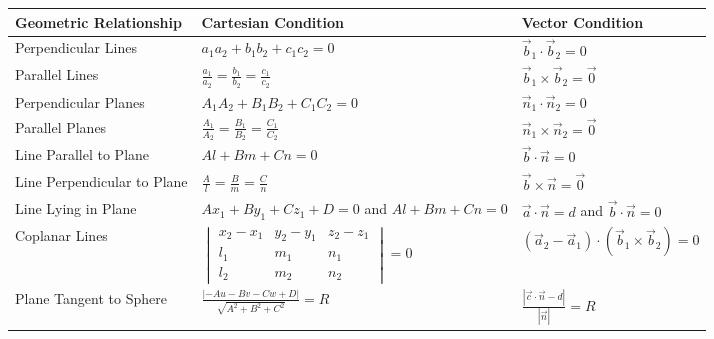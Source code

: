 \begin{center}
\small
\renewcommand{\arraystretch}{1.3}
\setlength{\tabcolsep}{4pt}
\begin{tabular}{|p{3.5cm}|p{5.5cm}|p{5.0cm}|}
\hline
\textbf{Geometric Relationship} & \textbf{Cartesian Condition} & \textbf{Vector Condition} \\
\hline
Perpendicular Lines & $a_1 a_2 + b_1 b_2 + c_1 c_2 = 0$ & $\vec{b}_1 \cdot \vec{b}_2 = 0$ \\
Parallel Lines & $\frac{a_1}{a_2} = \frac{b_1}{b_2} = \frac{c_1}{c_2}$ & $\vec{b}_1 \times \vec{b}_2 = \vec{0}$ \\
Perpendicular Planes & $A_1 A_2 + B_1 B_2 + C_1 C_2 = 0$ & $\vec{n}_1 \cdot \vec{n}_2 = 0$ \\
Parallel Planes & $\frac{A_1}{A_2} = \frac{B_1}{B_2} = \frac{C_1}{C_2}$ & $\vec{n}_1 \times \vec{n}_2 = \vec{0}$ \\
Line Parallel to Plane & $Al + Bm + Cn = 0$ & $\vec{b} \cdot \vec{n} = 0$ \\
Line Perpendicular to Plane & $\frac{A}{l} = \frac{B}{m} = \frac{C}{n}$ & $\vec{b} \times \vec{n} = \vec{0}$ \\
Line Lying in Plane & $Ax_1+By_1+Cz_1+D = 0$ and $Al+Bm+Cn = 0$ & $\vec{a} \cdot \vec{n} = d$ and $\vec{b} \cdot \vec{n} = 0$ \\
Coplanar Lines & $\begin{vmatrix} x_2-x_1 & y_2-y_1 & z_2-z_1 \\ l_1 & m_1 & n_1 \\ l_2 & m_2 & n_2 \end{vmatrix} = 0$ & $(\vec{a}_2 - \vec{a}_1) \cdot (\vec{b}_1 \times \vec{b}_2) = 0$ \\
Plane Tangent to Sphere & $\frac{|-Au-Bv-Cw+D|}{\sqrt{A^2+B^2+C^2}} = R$ & $\frac{|\vec{c} \cdot \vec{n} - d|}{|\vec{n}|} = R$ \\
\hline
\end{tabular}
\end{center}
